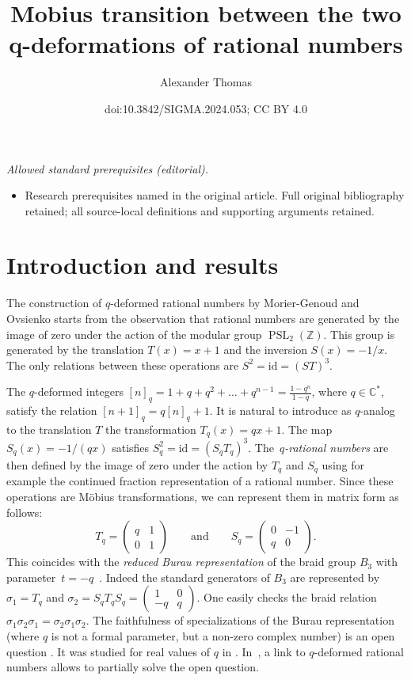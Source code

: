 \documentclass[10pt,a4paper]{amsart}
\title{Mobius transition between the two q-deformations of rational numbers}
\author{Alexander Thomas}
\date{doi:10.3842/SIGMA.2024.053; CC BY 4.0}
\numberwithin{equation}{section}
\newcommand*{\C}{\mathbb{C}}
\newcommand*{\Z}{\mathbb{Z}}
\DeclareMathOperator{\PSL}{PSL}
\begin{document}
\maketitle
\noindent\textit{Allowed standard prerequisites (editorial).}\begin{itemize}
\item Research prerequisites named in the original article. Full original bibliography retained; all source-local definitions and supporting arguments retained.
\end{itemize}\medskip
\section{Introduction and results}

The construction of $q$-deformed rational numbers by Morier-Genoud and Ovsienko \cite{morier2020continued} starts from the observation that rational numbers are generated by the image of zero under the action of the modular group $\PSL_2(\Z)$. This group is generated by the translation $T(x)=x+1$ and the inversion $S(x)=-1/x$. The only relations between these operations are $S^2=\mathrm{id}=(ST)^3$.

The $q$-deformed integers $[n]_q=1+q+q^2+\dots +q^{n-1}=\frac{1-q^n}{1-q}$, where $q\in \C^*$, satisfy the relation $[n+1]_q=q[n]_q+1$. It is natural to introduce as $q$-analog to the translation $T$ the transformation $T_q(x)=qx+1$. The map $S_q(x)=-1/(qx)$ satisfies $S_q^2=\mathrm{id}=(S_qT_q)^3$. The~\emph{$q$-rational numbers} are then defined by the image of zero under the action by $T_q$ and $S_q$ using for example the continued fraction representation of a rational number. Since these operations are M\"obius transformations, we can represent them in matrix form as follows:
\[
T_q=\begin{pmatrix} q&1\\ 0 & 1 \end{pmatrix}\qquad \text{and}\qquad S_q=\begin{pmatrix} 0&-1\\ q & 0 \end{pmatrix}.
\]
This coincides with the \emph{reduced Burau representation} of the braid group $B_3$ with parameter~${t=-q}$~\cite{burau}. Indeed the standard generators of $B_3$ are represented by $\sigma_1=T_q$ and $\sigma_2=S_qT_qS_q=\left(\begin{smallmatrix}1 & 0 \\ -q & q\end{smallmatrix}\right)$. One easily checks the braid relation $\sigma_1\sigma_2\sigma_1=\sigma_2\sigma_1\sigma_2$. The faithfulness of specializations of the Burau representation (where $q$ is not a formal parameter, but a non-zero complex number) is an open question \cite[Section 7]{bharathram2021burau}. It was studied for real values of $q$ in \cite{scherich2020classification}. In~\cite{morier2023}, a link to $q$-deformed rational numbers allows to partially solve the open question.
\end{document}
